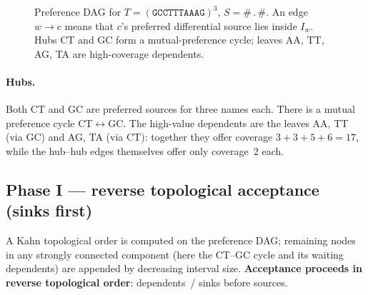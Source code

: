 \documentclass[11pt,a4paper]{article}
\begin{document}
\begin{figure}[ht]
\centering
{}
\caption{Preference DAG for
\(T=(\mathtt{GCCTTTAAAG})^3\), \(S=\mathtt{\#\,.\,\#}\).
An edge \(w\to c\) means that \(c\)'s preferred differential source
lies inside \(I_w\). Hubs CT and GC form a mutual-preference cycle;
leaves AA, TT, AG, TA are high-coverage dependents.}
\label{fig:pref-dag}
\end{figure}

\paragraph{Hubs.}
Both CT and GC are preferred sources for three names each. There is a
mutual preference cycle \(\mathrm{CT}\leftrightarrow\mathrm{GC}\). The
high-value dependents are the leaves AA, TT (via GC) and AG, TA (via
CT): together they offer coverage \(3+3+5+6=17\), while the hub--hub
edges themselves offer only coverage~2 each.

\subsection{Phase I --- reverse topological acceptance (sinks first)}

A Kahn topological order is computed on the preference DAG; remaining
nodes in any strongly connected component (here the CT--GC cycle and
its waiting dependents) are appended by decreasing interval size.
\textbf{Acceptance proceeds in reverse topological order}:
dependents~/ sinks before sources.
\end{document}
